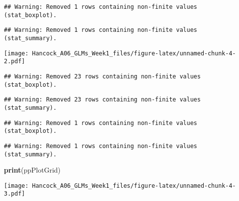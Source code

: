 \documentclass[
]{article}
\newenvironment{Shaded}{\begin{snugshade}}{\end{snugshade}}
\newcommand{\CommentTok}[1]{\textcolor[rgb]{0.56,0.35,0.01}{\textit{#1}}}
\newcommand{\DataTypeTok}[1]{\textcolor[rgb]{0.13,0.29,0.53}{#1}}
\newcommand{\DecValTok}[1]{\textcolor[rgb]{0.00,0.00,0.81}{#1}}
\newcommand{\FloatTok}[1]{\textcolor[rgb]{0.00,0.00,0.81}{#1}}
\newcommand{\KeywordTok}[1]{\textcolor[rgb]{0.13,0.29,0.53}{\textbf{#1}}}
\newcommand{\NormalTok}[1]{#1}
\newcommand{\OperatorTok}[1]{\textcolor[rgb]{0.81,0.36,0.00}{\textbf{#1}}}
\newcommand{\StringTok}[1]{\textcolor[rgb]{0.31,0.60,0.02}{#1}}
\begin{document}
\begin{verbatim}
## Warning: Removed 1 rows containing non-finite values (stat_boxplot).
\end{verbatim}

\begin{verbatim}
## Warning: Removed 1 rows containing non-finite values (stat_summary).
\end{verbatim}

\texttt{[image: Hancock\_A06\_GLMs\_Week1\_files/figure-latex/unnamed-chunk-4-2.pdf]}

\begin{Shaded}
\end{Shaded}

\begin{verbatim}
## Warning: Removed 23 rows containing non-finite values (stat_boxplot).
\end{verbatim}

\begin{verbatim}
## Warning: Removed 23 rows containing non-finite values (stat_summary).
\end{verbatim}

\begin{verbatim}
## Warning: Removed 1 rows containing non-finite values (stat_boxplot).
\end{verbatim}

\begin{verbatim}
## Warning: Removed 1 rows containing non-finite values (stat_summary).
\end{verbatim}

\begin{Shaded}
\begin{Highlighting}[]
\KeywordTok{print}\NormalTok{(ppPlotGrid)}
\end{Highlighting}
\end{Shaded}

\texttt{[image: Hancock\_A06\_GLMs\_Week1\_files/figure-latex/unnamed-chunk-4-3.pdf]}
\end{document}
